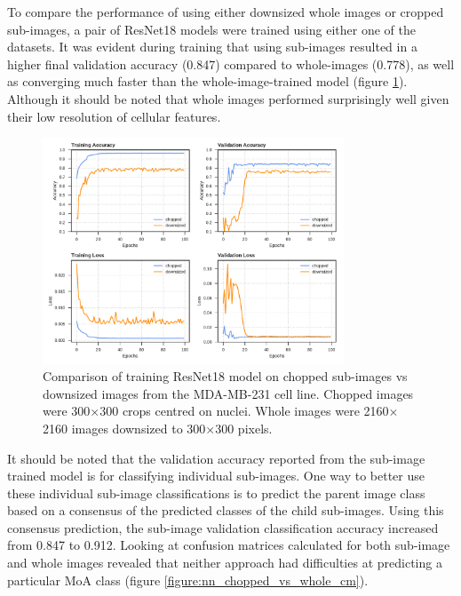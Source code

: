 \documentclass[a4paper,11pt,twoside,openright]{scrbook}
\begin{document}
To compare the performance of using either downsized whole images or cropped sub-images, a pair of ResNet18 models were trained using either one of the datasets.
It was evident during training that using sub-images resulted in a higher final validation accuracy (0.847) compared to whole-images (0.778), as well as converging much faster than the whole-image-trained model (figure \ref{figure:nn_chopped_vs_whole_curves}).
Although it should be noted that whole images performed surprisingly well given their low resolution of cellular features.

\begin{figure}
    \includegraphics[width=0.8\textwidth]{ch2choppedVsWhole}
    \captionsetup{width=0.8\textwidth}
    \caption[Comparison of whole images vs sub-images]{
Comparison of training ResNet18 model on chopped sub-images vs downsized images from the MDA-MB-231 cell line.
Chopped images were 300$\times$300 crops centred on nuclei.
Whole images were 2160$\times$2160 images downsized to 300$\times$300 pixels.
}
    \label{figure:nn_chopped_vs_whole_curves}
\end{figure}


It should be noted that the validation accuracy reported from the sub-image trained model is for classifying individual sub-images.
One way to better use these individual sub-image classifications is to predict the parent image class based on a consensus of the predicted classes of the child sub-images.
Using this consensus prediction, the sub-image validation classification accuracy increased from 0.847 to 0.912.
Looking at confusion matrices calculated for both sub-image and whole images revealed that neither approach had difficulties at predicting a particular MoA class (figure \ref{figure:nn_chopped_vs_whole_cm}).
\end{document}
